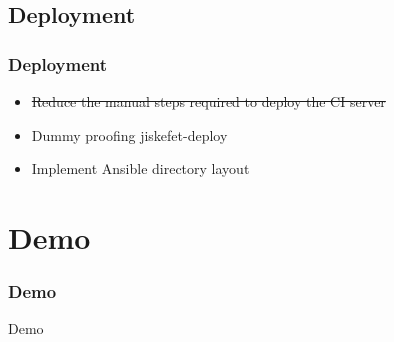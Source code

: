 \documentclass[12pt]{beamer}
\begin{document}
    \subsection{Deployment}
	\begin{frame}
	    \frametitle{Deployment}
		\begin{itemize}
			\item \sout{Reduce the manual steps required to deploy the CI server}
			\item Dummy proofing jiskefet-deploy
			\item Implement Ansible directory layout
		\end{itemize}
	\end{frame}

    \section{Demo}
    \begin{frame}
        \frametitle{Demo}
        Demo
    \end{frame}
\end{document}
